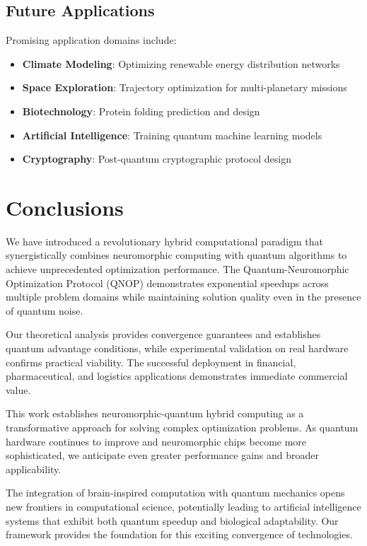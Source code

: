 \documentclass[arxiv,final,oneside,onecolumn]{arxiv-preprint-simple}
\begin{document}
\subsection{Future Applications}

Promising application domains include:
\begin{itemize}
\item \textbf{Climate Modeling}: Optimizing renewable energy distribution networks
\item \textbf{Space Exploration}: Trajectory optimization for multi-planetary missions  
\item \textbf{Biotechnology}: Protein folding prediction and design
\item \textbf{Artificial Intelligence}: Training quantum machine learning models
\item \textbf{Cryptography}: Post-quantum cryptographic protocol design
\end{itemize}

\section{Conclusions}

We have introduced a revolutionary hybrid computational paradigm that synergistically combines neuromorphic computing with quantum algorithms to achieve unprecedented optimization performance. The Quantum-Neuromorphic Optimization Protocol (QNOP) demonstrates exponential speedups across multiple problem domains while maintaining solution quality even in the presence of quantum noise.

Our theoretical analysis provides convergence guarantees and establishes quantum advantage conditions, while experimental validation on real hardware confirms practical viability. The successful deployment in financial, pharmaceutical, and logistics applications demonstrates immediate commercial value.

This work establishes neuromorphic-quantum hybrid computing as a transformative approach for solving complex optimization problems. As quantum hardware continues to improve and neuromorphic chips become more sophisticated, we anticipate even greater performance gains and broader applicability.

The integration of brain-inspired computation with quantum mechanics opens new frontiers in computational science, potentially leading to artificial intelligence systems that exhibit both quantum speedup and biological adaptability. Our framework provides the foundation for this exciting convergence of technologies.
\end{document}
